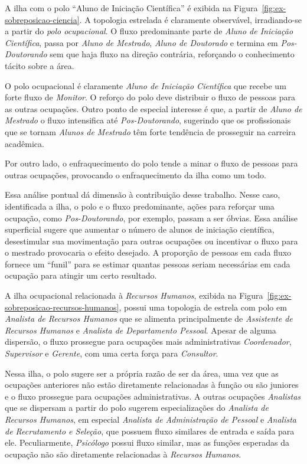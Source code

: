 \documentclass[12pt,a4paper]{article}
\begin{document}
A ilha com o polo \enquote{Aluno de Iniciação Científica} é exibida na Figura~\ref{fig:ex-sobreposicao-ciencia}. A topologia estrelada é claramente observável, irradiando-se a partir do \textit{polo ocupacional}. O fluxo predominante parte de \textit{Aluno de Iniciação Científica}, passa por \textit{Aluno de Mestrado}, \textit{Aluno de Doutorado} e termina em \textit{Pos-Doutorando} sem que haja fluxo na direção contrária, reforçando o conhecimento tácito sobre a área.

O polo ocupacional é claramente \textit{Aluno de Iniciação Científica} que recebe um forte fluxo de \textit{Monitor}. O reforço do polo deve distribuir o fluxo de pessoas para as outras ocupações. Outro ponto de especial interesse é que, a partir de \textit{Aluno de Mestrado} o fluxo intensifica até \textit{Pos-Doutorando}, sugerindo que os profissionais que se tornam \textit{Alunos de Mestrado} têm forte tendência de prosseguir na carreira acadêmica.

Por outro lado, o enfraquecimento do polo tende a minar o fluxo de pessoas para outras ocupações, provocando o enfraquecimento da ilha como um todo.

Essa análise pontual dá dimensão à contribuição desse trabalho. Nesse caso, identificada a ilha, o polo e o fluxo predominante,  ações para reforçar uma ocupação, como \textit{Pos-Doutorando}, por exemplo, passam a ser óbvias. Essa análise superficial sugere que aumentar o número de alunos de iniciação científica, desestimular sua movimentação para outras ocupações ou incentivar o fluxo para o mestrado provocaria o efeito desejado. A proporção de pessoas em cada fluxo fornece um \enquote{funil} para se estimar quantas pessoas seriam necessárias em cada ocupação para atingir um certo resultado.

A ilha ocupacional relacionada à \textit{Recursos Humanos}, exibida na Figura~\ref{fig:ex-sobreposicao-recursos-humanos}, possui uma topologia de estrela com polo em \textit{Analista de Recursos Humanos} que se alimenta principalmente de \textit{Assistente de Recursos Humanos} e \textit{Analista de Departamento Pessoal}. Apesar de alguma dispersão, o fluxo prossegue para ocupações mais administrativas \textit{Coordenador}, \textit{Supervisor} e \textit{Gerente}, com uma certa força para \textit{Consultor}.

Nessa ilha, o polo sugere ser a própria razão de ser da área, uma vez que as ocupações anteriores não estão diretamente relacionadas à função ou são juniores e o fluxo prossegue para ocupações administrativas. A outras ocupações \textit{Analistas} que se dispersam a partir do polo sugerem especializações do \textit{Analista de Recursos Humanos}, em especial \textit{Analista de Administração de Pessoal} e \textit{Analista de Recrutamento e Seleção}, que possuem fluxo similares de entrada e saída para ele. Peculiarmente, \textit{Psicólogo} possui fluxo similar, mas as funções esperadas da ocupação não são diretamente relacionadas à \textit{Recursos Humanos}.
\end{document}
